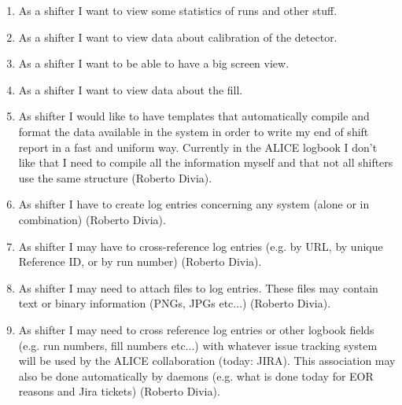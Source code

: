 \begin{enumerate}
  \item As a shifter I want to view some statistics of runs and other stuff.
  \item As a shifter I want to view data about calibration of the detector.
  \item As a shifter I want to be able to have a big screen view.
  \item As a shifter I want to view data about the fill.
  \item As shifter I would like to have templates that automatically compile  and format the data available in the system in order to write my end of shift report in a fast and uniform way. Currently in the ALICE logbook I don't like that I need to compile all the information myself and that not all shifters use the same structure (Roberto Divia).
  \item As shifter I have to create log entries concerning any system (alone or in combination) (Roberto Divia).
  \item As shifter I may have to cross-reference log entries (e.g. by URL, by unique Reference ID, or by run number)  (Roberto Divia).
  \item  As shifter I may need to attach files to log entries. These files may contain text or binary information (PNGs, JPGs etc...) (Roberto Divia).
  \item As shifter I may need to cross reference log entries or other logbook fields (e.g. run numbers, fill numbers etc...) with whatever issue tracking system will be used by the ALICE collaboration (today: JIRA). This association may also be done automatically by daemons (e.g. what is done today for EOR reasons and Jira tickets) (Roberto Divia).

\end{enumerate}

